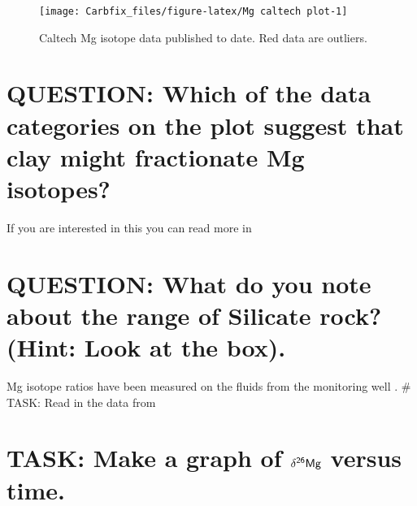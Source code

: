 \documentclass[nofonts,x11names]{tufte-handout}
\begin{document}

\begin{figure}
\texttt{[image: Carbfix\_files/figure-latex/Mg caltech plot-1]} \caption[Caltech Mg isotope data published to date]{Caltech Mg isotope data published to date. Red data are outliers.}\label{fig:Mg caltech plot}
\end{figure}

\section{QUESTION: Which of the data categories on the plot suggest that
clay might fractionate Mg
isotopes?}\label{question-which-of-the-data-categories-on-the-plot-suggest-that-clay-might-fractionate-mg-isotopes}

\noindent If you are interested in this you can read more in
\citet{Tipper:2022aa}

\section{QUESTION: What do you note about the range of Silicate rock?
(Hint: Look at the
box).}\label{question-what-do-you-note-about-the-range-of-silicate-rock-hint-look-at-the-box.}

\noindent  Mg isotope ratios have been measured on the fluids from the
monitoring well \citet{OELKERS2018}. \# TASK: Read in the data from
\citet{OELKERS2018}

\section{\texorpdfstring{TASK: Make a graph of \(\sf \delta^{26}Mg\)
versus
time.}{TASK: Make a graph of \textbackslash sf \textbackslash delta\^{}\{26\}Mg versus time.}}\label{task-make-a-graph-of-sf-delta26mg-versus-time.}
\end{document}
